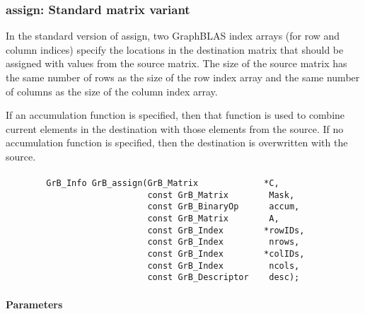\subsubsection{{\sf assign}: Standard matrix variant}

In the standard version of {\sf assign}, two GraphBLAS index arrays (for row and
column indices) specify the locations in the destination matrix that should be 
assigned with values from the source matrix.  The size of the source matrix has the same
number of rows as the size of the row index array and the same number
of columns as the size of the column index array.

If an accumulation function is specified, then that function is used
to combine current elements in the destination with those elements
from the source.  If no accumulation function is specified, then the
destination is overwritten with the source.

\paragraph{\syntax}

\begin{verbatim}
        GrB_Info GrB_assign(GrB_Matrix             *C,
                            const GrB_Matrix        Mask,
                            const GrB_BinaryOp      accum,
                            const GrB_Matrix        A,
                            const GrB_Index        *rowIDs,
                            const GrB_Index         nrows,
                            const GrB_Index        *colIDs,
                            const GrB_Index         ncols,
                            const GrB_Descriptor    desc);
\end{verbatim}

\paragraph{Parameters}

